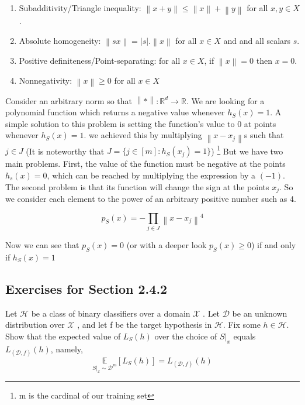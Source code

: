 \documentclass[]{book}
\theoremstyle{definition}
\begin{document}
\begin{enumerate}
    \item Subadditivity/Triangle inequality: ${\displaystyle \left\|x+y\right\| \leq \left\|x\right\|+\left\|y\right\|}$ for all ${\displaystyle x,y\in X}$.
    \item Absolute homogeneity: ${\displaystyle \left\|sx\right\|=\left|s\right|.\left\|x\right\|}$ for all $x\in X$ and and all scalars $s$. 
    \item Positive definiteness/Point-separating: for all ${\displaystyle x\in X}$, if $\left\|x\right\|=0$ then $x=0$.
    \item Nonnegativity: $\left\| x \right\| \geq 0$ for all $x\in X$
\end{enumerate}
Consider an arbitrary norm so that $\left\| * \right\|:\mathbb{R}^d\rightarrow \mathbb{R} $. We are looking for a polynomial function which returns a negative value whenever $h_S(x)=1$. A simple solution to this problem is setting the function's value to $0$ at points  whenever $h_S(x)=1$. we achieved this by multiplying $\left \| x-x_j \right \|$s such that $j \in J$ (It is noteworthy that $J=\{j\in [m]:h_S(x_j)=1 \}$) \footnote{m is the cardinal of our training set} But we have two main problems. First, the value of the function must be negative at the points $h_s(x)=0$, which can be reached by multiplying the expression by a $(-1)$. The second problem is that its function will change the sign at the points $x_j$. So we consider each element to the power of an arbitrary positive number such as 4.

\begin{equation*}
    p_S(x)=-\prod_{j\in J}\left \| x-x_j \right \|^4
\end{equation*}

Now we can see that $p_S(x)=0$ (or with a deeper look $p_S(x)\geq 0$) if and only if $h_S(x)=1$

\subsection*{Exercises for Section 2.4.2}
Let $\mathcal{H}$ be a class of binary classifiers over a domain $\mathcal{X}$ . Let $\mathcal{D}$ be an unknown distribution over $\mathcal{X}$ , and let f be the target hypothesis in $\mathcal{H}$.
Fix some $h \in \mathcal{H}$. Show that
the expected value of $L_S(h)$ over the choice of $S|_x$ equals $L_{(\mathcal{D},f)}(h)$, namely,
\begin{equation*}
   \underset{S|_x \sim \mathcal{D}^m}{\mathbb{E}}[L_S(h)]=L_{(\mathcal{D},f)}(h)
\end{equation*}
  
\end{document}
